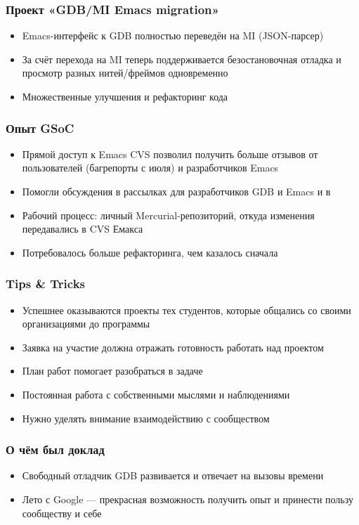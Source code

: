 \documentclass[onlymath]{beamer}
\begin{document}
\begin{frame}
  \frametitle{Проект «GDB/MI Emacs migration»}
  \begin{itemize}
  \item Emacs-интерфейс к GDB полностью переведён на MI (JSON-парсер)
  \item За счёт перехода на MI теперь поддерживается безостановочная
    отладка и просмотр разных нитей/фреймов одновременно
  \item Множественные улучшения и рефакторинг кода
  \end{itemize}
\end{frame}

\begin{frame}
  \frametitle{Опыт GSoC}
  \begin{itemize}
  \item Прямой доступ к Emacs CVS позволил получить больше отзывов от
    пользователей (багрепорты с июля) и разработчиков Emacs
  \item Помогли обсуждения в рассылках для разработчиков GDB и Emacs и
    в 
  \item Рабочий процесс: личный Mercurial-репозиторий, откуда
    изменения передавались в CVS Емакса
  \item Потребовалось больше рефакторинга, чем казалось сначала
  \end{itemize}
\end{frame}

\begin{frame}
  \frametitle{Tips \& Tricks}
  \begin{itemize}
  \item Успешнее оказываются проекты тех студентов, которые общались
    со своими организациями до программы
    
  \item Заявка на участие должна отражать готовность работать над
    проектом

  \item План работ помогает разобраться в задаче
    
  \item Постоянная работа с собственными мыслями и наблюдениями
    
  \item Нужно уделять внимание взаимодействию с сообществом
  \end{itemize}
\end{frame}

\appendix
\begin{frame}
  \frametitle{О чём был доклад}
  \begin{itemize}
  \item Свободный отладчик GDB развивается и отвечает на вызовы
    времени
  \item Лето с Google — прекрасная возможность получить опыт и
    принести пользу сообществу и себе
  \end{itemize}
\end{frame}
\end{document}
